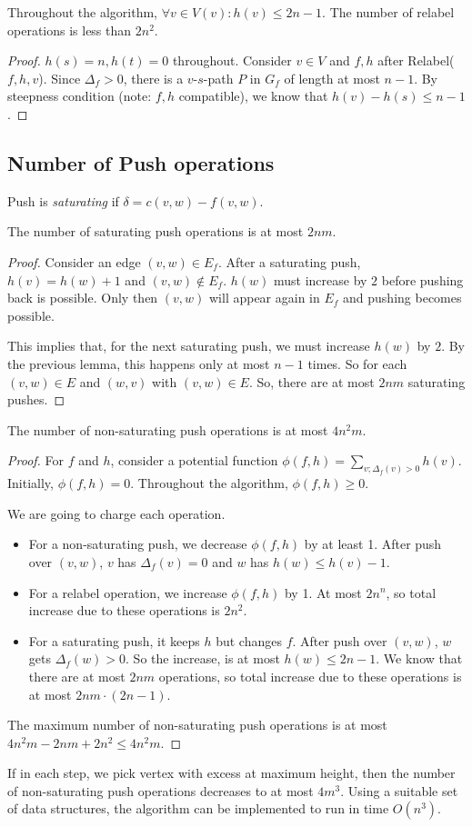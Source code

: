 \begin{mylemma}
Throughout the algorithm, $\forall v \in V(v): h(v) \le 2n -1$. The number of relabel operations is less than $2n^2$.
\end{mylemma}
\begin{proof}
$h(s) = n, h(t) = 0$ throughout. Consider $v \in V$ and $f,h$ after Relabel($f,h,v$).
Since $\Delta_f > 0$, there is a $v$-$s$-path $P$ in $G_f$ of length at most $n-1$.
By steepness condition (note: $f,h$ compatible), we know that $h(v) - h(s) \le n-1$. 
\end{proof}

\subsection{Number of Push operations}

Push is \emph{saturating} if $\delta = c(v,w) - f(v,w)$.

\begin{mylemma}
The number of saturating push operations is at most $2nm$.
\end{mylemma}
\begin{proof}
Consider an edge $(v,w) \in E_f$. After a saturating push, $h(v) = h(w) + 1$ and $(v,w) \notin E_f$. $h(w)$ must increase by $2$ before pushing back is possible. Only then $(v,w)$ will appear again in $E_f$ and pushing becomes possible.

This implies that, for the next saturating push, we must increase $h(w)$ by $2$. By the previous lemma, this happens only at most $n-1$ times. So for each $(v,w) \in E$ and $(w,v)$ with $(v,w) \in E$. So, there are at most $2nm$ saturating pushes.
\end{proof}

\begin{mylemma}
The number of non-saturating push operations is at most $4n^2 m$.
\end{mylemma}
\begin{proof}
For $f$ and $h$, consider a potential function $\phi(f,h) = \sum_{v; \Delta_f(v) > 0} h(v)$. Initially, $\phi(f,h) = 0$. Throughout the algorithm, $\phi(f,h) \ge 0$.

We are going to charge each operation.

\begin{itemize}
\item For a non-saturating push, we decrease $\phi(f,h)$ by at least 1. After push over $(v,w)$, $v$ has $\Delta_f(v) = 0$ and $w$ has $h(w) \le h(v) - 1$.
\item For a relabel operation, we increase $\phi(f,h)$ by 1. At most $2n^n$, so total increase due to these operations is $2n^2$.
\item For a saturating push, it keeps $h$ but changes $f$. After push over $(v,w)$, $w$ gets $\Delta_f(w) > 0$. So the increase, is at most $h(w) \le 2n-1$. We know that there are at most $2nm$ operations, so total increase due to these operations is at most $2nm \cdot (2n-1)$. 
\end{itemize}

The maximum number of non-saturating push operations is at most $4n^2m - 2nm + 2n^2 \le 4n^2 m$. \end{proof}

If in each step, we pick vertex with excess at maximum height, then the number of non-saturating push operations decreases to at most $4m^3$. Using a suitable set of data structures, the algorithm can be implemented to run in time $O(n^3)$.

